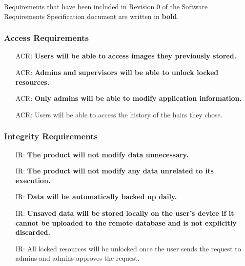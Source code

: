 \documentclass{article}
\newcounter{acrreqnum} %
\newcounter{irreqnum} %
\begin{document}
Requirements that have been included in Revision 0 of the Software Requirements Specification document are written in \textbf{bold}. 

\subsubsection{Access Requirements}
\begin{itemize}
    \item[ACR\refstepcounter{acrreqnum}\theacrreqnum \label{R_Inputs}:] \textbf{Users will be able to access images they previously stored.}
    \item[ACR\refstepcounter{acrreqnum}\theacrreqnum \label{R_Inputs}:]
    \textbf{Admins and supervisors will be able to unlock locked resources.}
    \item[ACR\refstepcounter{acrreqnum}\theacrreqnum \label{R_Inputs}:]
    \textbf{Only admins will be able to modify application information.}
    \item[ACR\refstepcounter{acrreqnum}\theacrreqnum\label{R_Inputs}:] 
    Users will be able to access the history of the hairs they chose.
\end{itemize}


\subsubsection{Integrity Requirements}
\begin{itemize}
    \item[IR\refstepcounter{irreqnum}\theirreqnum \label{R_Inputs}:] \textbf{The product will not modify data unnecessary.}
    \item[IR\refstepcounter{irreqnum}\theirreqnum \label{R_Inputs}:] \textbf{The product will not modify any data unrelated to its execution.}
    \item[IR\refstepcounter{irreqnum}\theirreqnum \label{R_Inputs}:] \textbf{Data will be automatically backed up daily.}
    \item[IR\refstepcounter{irreqnum}\theirreqnum \label{R_Inputs}:] \textbf{Unsaved data will be stored locally on the user's device if it cannot be uploaded to the remote database and is not explicitly discarded.}
    \item[IR\refstepcounter{irreqnum}\theirreqnum \label{R_Inputs}:] All locked resources will be unlocked once the user sends the request to admins and admins approves the request.
\end{itemize}
\end{document}
